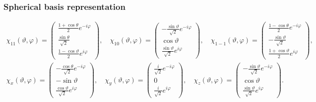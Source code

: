 \subsubsection{Spherical basis representation}
\begin{gather}
\chi_{11}(\vartheta, \varphi)=\begin{pmatrix}
\frac{1+\cos \theta}{2} e^{-i \varphi} \\
\frac{\sin \theta}{\sqrt{2}} \\
\frac{1-\cos \vartheta}{2} e^{i \varphi}
\end{pmatrix}, \quad \chi_{10}(\vartheta, \varphi)=\begin{pmatrix}
-\frac{\sin \vartheta}{\sqrt{2}} e^{-i \varphi} \\
\cos \vartheta \\
\frac{\sin \vartheta}{\sqrt{2}} e^{i \varphi}
\end{pmatrix}, \quad \chi_{1-1}(\vartheta, \varphi)=\begin{pmatrix}
\frac{1-\cos \theta}{2} e^{-i \varphi} \\
-\frac{\sin \vartheta}{\sqrt{2}} \\
\frac{1+\cos \vartheta}{2} e^{i \varphi}
\end{pmatrix}, \label{eq:6:3:49}\\
\chi_{x}(\vartheta, \varphi)=\begin{pmatrix}
-\frac{\cos \theta}{\sqrt{2}} e^{-i \varphi} \\
-\sin \vartheta \\
\frac{\cos \vartheta}{\sqrt{2}} e^{i \varphi}
\end{pmatrix}, \quad \chi_{y}(\vartheta, \varphi)=\begin{pmatrix}
\frac{i}{\sqrt{2}} e^{-i \varphi} \\
0 \\
\frac{i}{\sqrt{2}} e^{i \varphi}
\end{pmatrix}, \quad \chi_{z}(\vartheta, \varphi)=\begin{pmatrix}
-\frac{\sin \vartheta}{\sqrt{2}} e^{-i \varphi} \\
\cos \vartheta \\
\frac{\sin \vartheta}{\sqrt{2}} e^{i \varphi}
\end{pmatrix} . \label{eq:6:3:50}
\end{gather}
